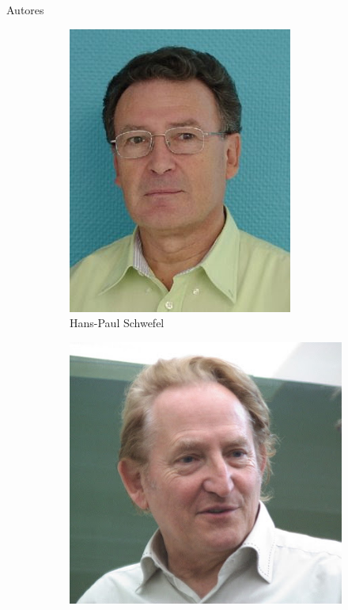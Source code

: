 \documentclass[10pt]{beamer}
\begin{document}
\begin{frame}[fragile]{Autores}

  \begin{figure}[htp]
    \begin{subfigure}[b]{.3\textwidth}
      \includegraphics[width=.95\textwidth]{imgs/schwefel.jpg}
      \caption*{Hans-Paul Schwefel}
    \end{subfigure}%
    \begin{subfigure}[b]{.3\textwidth}
      \includegraphics[width=.95\textwidth]{imgs/rechenberg.jpg}

\end{subfigure}
\end{figure}
\end{frame}
\end{document}
